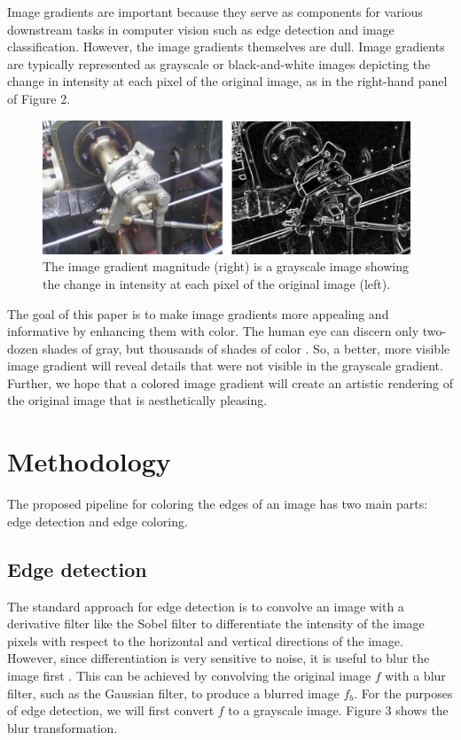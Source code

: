\documentclass[runningheads]{llncs}
\begin{document}
Image gradients are important because they serve as components for various downstream tasks in computer vision such as edge detection and image classification. However, the image gradients themselves are dull. Image gradients are typically represented as grayscale or black-and-white images depicting the change in intensity at each pixel of the original image, as in the right-hand panel of Figure 2.

\begin{figure}
\centering
\includegraphics[height=4cm]{images/image_gradient.png}
\caption{The image gradient magnitude (right) is a grayscale image showing the change in intensity at each pixel of the original image (left).}
\label{fig:example}
\end{figure}

The goal of this paper is to make image gradients more appealing and informative by enhancing them with color. The human eye can discern only two-dozen shades of gray, but thousands of shades of color \cite{human_machine}. So, a better, more visible image gradient will reveal details that were not visible in the grayscale gradient. Further, we hope that a colored image gradient will create an artistic rendering of the original image that is aesthetically pleasing.

\section{Methodology}

The proposed pipeline for coloring the edges of an image has two main parts: edge detection and edge coloring.

\subsection{Edge detection}

The standard approach for edge detection is to convolve an image with a derivative filter like the Sobel filter to differentiate the intensity of the image pixels with respect to the horizontal and vertical directions of the image. However, since differentiation is very sensitive to noise, it is useful to blur the image first \cite{filtering_lecture}. This can be achieved by convolving the original image $f$ with a blur filter, such as the Gaussian filter, to produce a blurred image $f_b$. For the purposes of edge detection, we will first convert $f$ to a grayscale image. Figure 3 shows the blur transformation.
\end{document}
